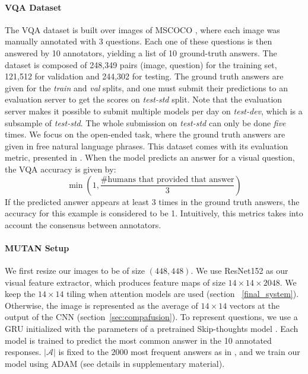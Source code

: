 \documentclass[10pt,twocolumn,letterpaper]{article}
\begin{document}
\paragraph{VQA Dataset}
The VQA dataset \cite{VQA} is built over images of MSCOCO \cite{mscoco}, where each image was manually annotated with 3 questions. Each one of these questions is then answered by 10 annotators, yielding a list of 10 ground-truth answers.
The dataset is composed of 248,349 pairs (image, question) for the training set, 121,512 for validation and 244,302 for testing. The ground truth answers are given for the \textit{train} and \textit{val} splits, and one must submit their predictions to an evaluation server to get the scores on \textit{test-std} split. Note that the evaluation server makes it possible to submit multiple models per day on \textit{test-dev}, which is a subsample of \textit{test-std}. The whole submission on \textit{test-std} can only be done \emph{five} times. We focus on the open-ended task, where the ground truth answers are given in free natural language phrases. This dataset comes with its evaluation metric, presented in \cite{VQA}. When the model predicts an answer for a visual question, the VQA accuracy is given by: 
\begin{equation}
\min \left( 1, \frac{\text{\# humans that provided that answer}}{3} \right)
\label{acc_vqa}
\end{equation}
If the predicted answer appears at least 3 times in the ground truth answers, the accuracy for this example is considered to be 1. Intuitively, this metrics takes into account the consensus between annotators.


\paragraph{MUTAN Setup}
We first resize our images to be of size $(448,448)$. We use ResNet152 \cite{He2015} as our visual feature extractor, 
which produces feature maps of size $14\times14\times2048$. 
We keep the $14\times14$ tiling when attention models are used (section ~\ref{final_system}). Otherwise, the image is represented as the average of $14 \times 14$ vectors at the output of the CNN (section~\ref{sec:compafusion}).
To represent questions, we use a GRU \cite{ChoMBB14} initialized with the parameters of a pretrained Skip-thoughts model \cite{Kiros2015}. 
Each model is trained to predict the most common answer in the 10 annotated responses.
$|\mathcal{A}|$ is fixed to the $2000$ most frequent answers as in \cite{Kim2017}, and we train our model using ADAM \cite{KingmaB14} (see details in supplementary material). 
\end{document}
